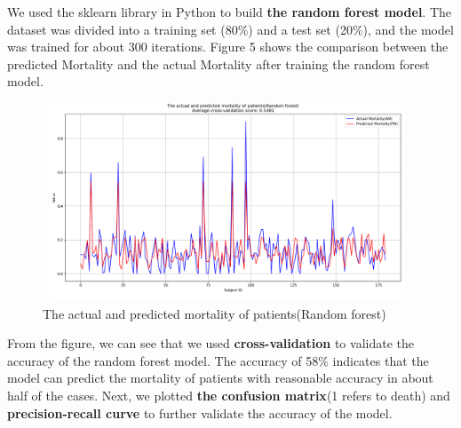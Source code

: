 \documentclass[13pt]{ctexart}
\begin{document}
We used the sklearn library in Python to build \textbf{the random forest model}. The dataset was divided into a training set (80\%) and a test set (20\%), and the model was trained for about 300 iterations. Figure 5 shows the comparison between the predicted Mortality and the actual Mortality after training the random forest model.

\begin{figure}[h]
    \centering
        \includegraphics[width=11cm,height=5.9cm]{pics/5.png}
        \caption{The actual and predicted mortality of patients(Random forest)}
\end{figure}

From the figure, we can see that we used \textbf{cross-validation} to validate the accuracy of the random forest model. The accuracy of 58\% indicates that the model can predict the mortality of patients with reasonable accuracy in about half of the cases. Next, we plotted \textbf{the confusion matrix}(1 refers to death) and \textbf{precision-recall curve} to further validate the accuracy of the model.
\end{document}
